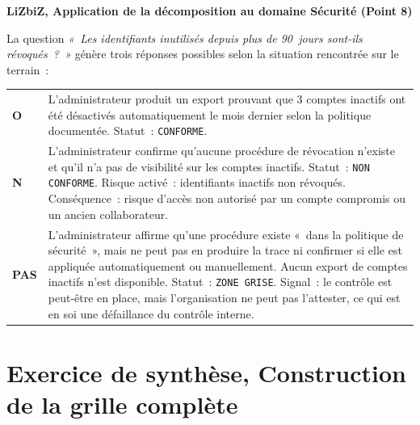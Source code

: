 \begin{boxlizbiz}
\textbf{LiZbiZ, Application de la décomposition au domaine Sécurité (Point 8)}

La question \textit{«~Les identifiants inutilisés depuis plus de 90~jours sont-ils révoqués~?~»} génère trois réponses possibles selon la situation rencontrée sur le terrain~:

\smallskip
\begin{tabular}{p{2cm}p{10.5cm}}
\textbf{O} & L'administrateur produit un export prouvant que 3 comptes inactifs ont été désactivés automatiquement le mois dernier selon la politique documentée. Statut~: \texttt{CONFORME}. \\
\addlinespace
\textbf{N} & L'administrateur confirme qu'aucune procédure de révocation n'existe et qu'il n'a pas de visibilité sur les comptes inactifs. Statut~: \texttt{NON CONFORME}. Risque activé~: identifiants inactifs non révoqués. Conséquence~: risque d'accès non autorisé par un compte compromis ou un ancien collaborateur. \\
\addlinespace
\textbf{PAS} & L'administrateur affirme qu'une procédure existe «~dans la politique de sécurité~», mais ne peut pas en produire la trace ni confirmer si elle est appliquée automatiquement ou manuellement. Aucun export de comptes inactifs n'est disponible. Statut~: \texttt{ZONE GRISE}. Signal~: le contrôle est peut-être en place, mais l'organisation ne peut pas l'attester, ce qui est en soi une défaillance du contrôle interne. \\
\end{tabular}
\end{boxlizbiz}


\section{Exercice de synthèse, Construction de la grille complète}
\label{sec:exercice}

